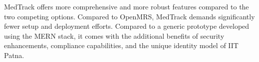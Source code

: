 MedTrack offers more comprehensive and more robust features compared to the two competing options. Compared to OpenMRS, MedTrack demands significantly fewer setup and deployment efforts. Compared to a generic prototype developed using the MERN stack, it comes with the additional benefits of security enhancements, compliance capabilities, and the unique identity model of IIT Patna.
